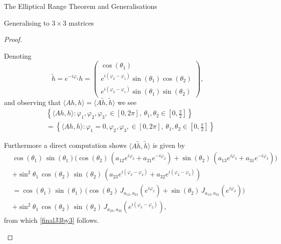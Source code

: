 \documentclass[12pt]{article}
\theoremstyle{plain}
\theoremstyle{definition}
\theoremstyle{remark}
\renewcommand{\phi}{\varphi}
\numberwithin{equation}{section}
\begin{document}
\begin{section}{The Elliptical Range Theorem and Generalisations}
\begin{subsection}{Generalising to $3 \times 3$ matrices}
\begin{proof}
\begin{enumerate}
Denoting $$ \tilde{h} = e^{-i\phi_1}
h =  \begin{pmatrix}
\cos (\theta_1) \\
e^{i(\phi_2 - \phi_1)}\sin (\theta_1)\cos (\theta_2) \\
e^{i(\phi_3-\phi_1)}\sin (\theta_1)\sin (\theta_2)
\end{pmatrix},
$$
and observing that $\langle Ah,h \rangle  = \langle A\tilde{h},\tilde{h} \rangle$ we see
\begin{align}
&\left\{ \langle Ah,h\rangle :  \phi_1, \phi_2, \phi_3, \in [0, 2 \pi], \ \theta_1, \theta_2 \in [0, \frac{\pi}{2} ]  \right\} \\
&= \left\{ \langle Ah,h\rangle :  \phi_1=0, \phi_2, \phi_3, \in [0, 2 \pi], \ \theta_1, \theta_2 \in [0, \frac{\pi}{2} ]  \right\}
\end{align}


Furthermore a direct computation shows $\langle A\tilde{h},\tilde{h}\rangle$ is given by
\[
\begin{aligned}
& \cos (\theta_1) \,\sin (\theta_1) \Big(
\cos (\theta_2) \,(a_{12} e^{i\phi_2} + a_{21} e^{-i\phi_2}) 
+ \sin (\theta_2) \,(a_{13} e^{i\phi_3} + a_{31} e^{-i\phi_3}) 
\Big)\\
&+ \sin^2\theta_1 \,\cos (\theta_2) \,\sin (\theta_2) \,(a_{23} e^{i(\phi_3-\phi_2)} + a_{32} e^{i(\phi_2-\phi_3)})\\
&= \cos (\theta_1) \,\sin (\theta_1) \,\Big(
\cos (\theta_2) \, J_{{a_{12}},a_{21}}(e^{i\phi_2}) + \sin (\theta_2) \, J_{a_{13},a_{31}}(e^{i\phi_3})
\Big)
\\
&+ \sin^2\theta_1 \, \cos (\theta_2) \, \sin (\theta_2) \, J_{a_{23},a_{32}}(e^{i(\phi_3-\phi_2)}),
\end{aligned}
\]
from which \eqref{finalJ3by3} follows.



\end{enumerate}
\end{proof}
\end{subsection}
\end{section}
\end{document}

